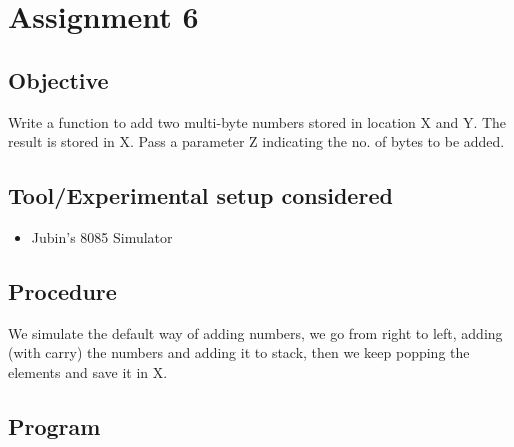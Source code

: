 \documentclass[a4paper]{article} %
\begin{document}
\section[Multi-Byte Addition]{Assignment 6} %
    \subsection{Objective}
        Write a function to add two multi-byte numbers stored in location X and Y. The result is stored in X. Pass a parameter Z indicating the no. of bytes to be added.
    \subsection{Tool/Experimental setup considered}
        \begin{itemize}
            \item Jubin's 8085 Simulator
        \end{itemize}
    \subsection{Procedure}
        We simulate the default way of adding numbers, we go from right to left, adding (with carry) the numbers and adding it to stack, then we keep popping the elements and save it in X.
    \subsection{Program}
        
        \newpage
\end{document}
